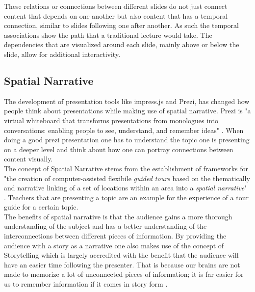 \documentclass[twoside, 12pt]{article}
\begin{document}
These relations or connections between different slides do not just connect content that depends on one another but also content that has a temporal connection, similar to slides following one after another. As such the temporal associations show the path that a traditional lecture would take. The dependencies that are visualized around each slide, mainly above or below the slide, allow for additional interactivity.

\subsection{Spatial Narrative}
\label{sec:spatialnarrative}

The development of presentation tools like impress.js and Prezi, has changed how people think about presentations while making use of spatial narrative. Prezi is "a virtual whiteboard that transforms presentations from monologues into conversations: enabling people to see, understand, and remember ideas" \cite{Prezi:npentrel14}. When doing a good prezi presentation one has to understand the topic one is presenting on a deeper level and think about how one can portray connections between content visually.\\

The concept of Spatial Narrative stems from the establishment of frameworks for "the creation of computer-assisted flexibile \textit{guided tours} based on the thematically and narrative linking of a set of locations within an area into a \textit{spatial narrative}" \cite{SpatialNarratives:npentrel14}. Teachers that are presenting a topic are an example for the experience of a tour guide for a certain topic.\\

The benefits of spatial narrative is that the audience gains a more thorough understanding of the subject and has a better understanding of the interconnections between different pieces of information. By providing the audience with a story as a narrative one also makes use of the concept of Storytelling which is largely accredited with the benefit that the audience will have an easier time following the presenter. That is because our brains are not made to memorize a lot of unconnected pieces of information; it is far easier for us to remember information if it comes in story form \cite{Storytelling:npentrel14}.\\
\end{document}

